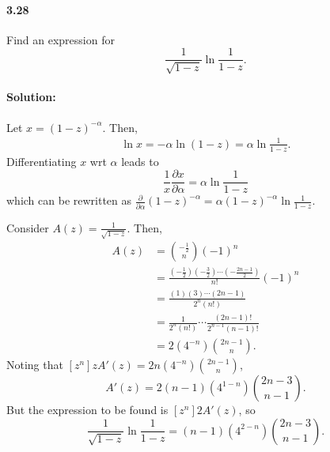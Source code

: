 \documentclass{article}
\begin{document}
\paragraph{3.28} Find an expression for \begin{equation*}
  [z^n]\frac{1}{\sqrt{1 - z}}\ln\frac{1}{1 - z}.
\end{equation*}

\paragraph{Solution:} Let $x = (1 - z)^{-\alpha}$. Then, \begin{align*}
  \ln x = -\alpha\ln(1 - z) = \alpha\ln\frac{1}{1 - z}.
\end{align*} Differentiating $x$ wrt $\alpha$ leads to \begin{equation*}
  \frac{1}{x}\frac{\partial x}{\partial \alpha} = \alpha\ln\frac{1}{1 - z}
\end{equation*} which can be rewritten as $\frac{\partial}{\partial \alpha}(1 -
z)^{-\alpha} = \alpha(1 - z)^{-\alpha}\ln\frac{1}{1 - z}$.

Consider $A(z) = \frac{1}{\sqrt{1 - z}}$. Then, \begin{align*}
  [z^n]A(z) &= \binom{-\frac{1}{2}}{n}(-1)^n \\
    &= \frac{(-\frac{1}{2})(-\frac{3}{2})\cdots(-\frac{2n - 1}{2})}{n!}
      (-1)^n \\
    &= \frac{(1)(3)\cdots(2n - 1)}{2^n(n!)} \\
    &= \frac{1}{2^n(n!)} \cdots \frac{(2n - 1)!}{2^{n - 1}(n - 1)!} \\
    &= 2(4^{-n})\binom{2n - 1}{n}.
\end{align*} Noting that $[z^n]zA'(z) = 2n(4^{-n})\binom{2n - 1}{n}$,
\begin{equation*}
  [z^n]A'(z) = 2(n - 1)(4^{1 - n})\binom{2n - 3}{n - 1}.
\end{equation*} But the expression to be found is $[z^n]2A'(z)$, so
\begin{equation*}
  [z^n]\frac{1}{\sqrt{1 - z}}\ln\frac{1}{1 - z} = (n - 1)(4^{2 - n})\binom{2n -
    3}{n - 1}.
\end{equation*}
\end{document}
